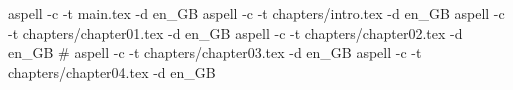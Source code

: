 aspell -c -t main.tex -d en_GB
aspell -c -t chapters/intro.tex -d en_GB
aspell -c -t chapters/chapter01.tex -d en_GB
aspell -c -t chapters/chapter02.tex -d en_GB
# aspell -c -t chapters/chapter03.tex -d en_GB
aspell -c -t chapters/chapter04.tex -d en_GB
